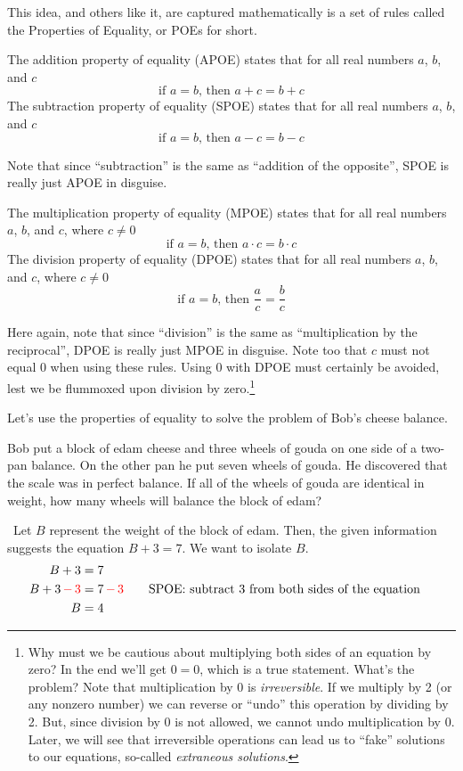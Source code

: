This idea, and others like it, are captured mathematically is a set of rules called the Properties of Equality, or POEs for short.

\begin{boxdef2col}
The \gls{addition property of equality} (APOE) states that for all real numbers $a$, $b$, and $c$ \[\text{if } a = b \text{, then } a + c = b + c\]
\tcblower
The \gls{subtraction property of equality} (SPOE) states that for all real numbers $a$, $b$, and $c$\[\text{if } a = b \text{, then } a - c = b - c\]
\end{boxdef2col}

Note that since ``subtraction'' is the same as ``addition of the opposite'', SPOE is really just APOE in disguise.

\begin{boxdef2col}
The \gls{multiplication property of equality} (MPOE) states that for all real numbers $a$, $b$, and $c$, where $c\neq 0$ \[\text{if } a = b \text{, then } a \cdot c = b \cdot c\]
\tcblower
The \gls{division property of equality} (DPOE) states that for all real numbers $a$, $b$, and $c$, where $c\neq 0$ \[\text{if } a = b \text{, then } \frac{a}{c} = \frac{b}{c}\]
\end{boxdef2col}

Here again, note that since ``division'' is the same as ``multiplication by the reciprocal'', DPOE is really just MPOE in disguise. Note too that $c$ must not equal 0 when using these rules. Using 0 with DPOE must certainly be avoided, lest we be flummoxed upon division by zero.\footnote{Why must we be cautious about multiplying both sides of an equation by zero? In the end we'll get $0=0$, which is a true statement. What's the problem? Note that multiplication by 0 is \textit{irreversible}. If we multiply by 2 (or any nonzero number) we can reverse or ``undo'' this operation by dividing by 2. But, since division by 0 is not allowed, we cannot undo multiplication by 0. Later, we will see that irreversible operations can lead us to ``fake'' solutions to our equations, so-called \textit{extraneous solutions}.}

Let's use the properties of equality to solve the problem of Bob's cheese balance.

\begin{boxex}
Bob put a block of edam cheese and three wheels of gouda on one side of a two-pan balance. On the other pan he put seven wheels of gouda. He discovered that the scale was in perfect balance. If all of the wheels of gouda are identical in weight, how many wheels will balance the block of edam?

\exsoln\ Let $B$ represent the weight of the block of edam. Then, the given information suggests the equation $B + 3 = 7$. We want to isolate $B$.
\[\begin{aligned}
B + 3 & = 7\\
B + 3 {\color{red} \,-\,3} & = 7 {\color{red} \,-\,3}
&&\text{\quad SPOE: subtract 3 from both sides of the equation}\\
B & = 4
\end{aligned}\]
\end{boxex}

